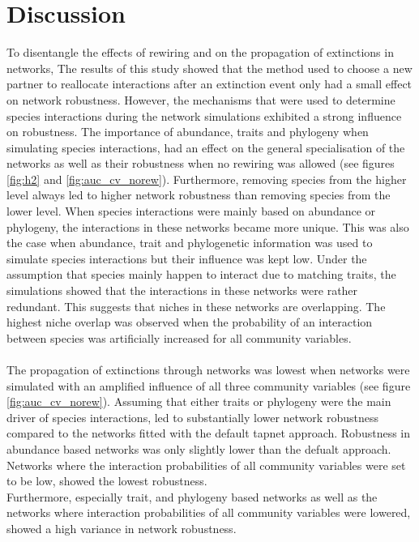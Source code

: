 \documentclass[12pt,a4paper]{article}
\begin{document}
	\section{Discussion}
To disentangle the effects of rewiring and on the propagation of extinctions in networks, 
The results of this study showed that the method used to choose a new partner to reallocate interactions after an extinction event only had a small effect on network robustness. However, the mechanisms that were used to determine species interactions during the network simulations exhibited a strong influence on robustness.
The importance of abundance, traits and phylogeny when simulating species interactions, had an effect on the general specialisation of the networks as well as their robustness when no rewiring was allowed (see figures \ref{fig:h2} and \ref{fig:auc_cv_norew}). Furthermore, removing species from the higher level always led to higher network robustness than removing species from the lower level. When species interactions were mainly based on abundance or phylogeny, the interactions in these networks became more unique. This was also the case when abundance, trait and phylogenetic information was used to simulate species interactions but their influence was kept low. Under the assumption that species mainly happen to interact due to matching traits, the simulations showed that the interactions in these networks were rather redundant. This suggests that niches in these networks are overlapping. The highest niche overlap was observed when the probability of an interaction between species was artificially increased for all community variables.\paragraph{}

The propagation of extinctions through networks was lowest when networks were simulated with an amplified influence of all three community variables (see figure \ref{fig:auc_cv_norew}). Assuming that either traits or phylogeny were the main driver of species interactions, led to substantially lower network robustness compared to the networks fitted with the default tapnet approach. Robustness in abundance based networks was only slightly lower than the defualt approach. Networks where the interaction probabilities of all community variables were set to be low, showed the lowest robustness.\\
Furthermore, especially trait, and phylogeny based networks as well as the networks where interaction probabilities of all community variables were lowered, showed a high variance in network robustness. \par
\end{document}
